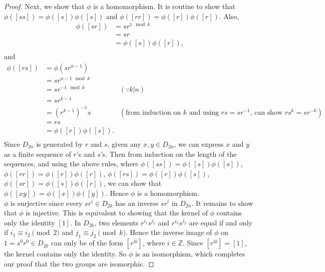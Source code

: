 \documentclass{article}
\begin{document}
\begin{enumerate}
\begin{enumerate}
\begin{enumerate}
\begin{proof}
              Next, we show that $\phi$ is a homomorphism. It is routine to
              show that $\phi([ss])=\phi([s])\phi([s])$ and
              $\phi([rr])=\phi([r])\phi([r])$. Also,
              \begin{align*}
                \phi([sr])  &= sr^{1\mod{k}}        \\
                            &= sr                   \\
                            &= \phi([s])\phi([r]),  \\
              \end{align*}
              and
              \begin{align*}
                \phi([rs])  &= \phi(sr^{n-1})   & \\
                            &= sr^{n-1\mod{k}}  & \\
                            &= sr^{-1\mod{k}}   & (\because k|n) \\
                            &= sr^{k-1}         & \\
                            &= (r^{k-1})^{-1}s  & (\text{from induction on
                            $k$ and using $rs=sr^{-1}$, can show
                            $rs^k=sr^{-k}$}) \\
                            &= rs               & \\
                            &= \phi([r])\phi([s]).  \\
              \end{align*}
              Since $D_{2n}$ is generated by $r$ and $s$, given any
              $x,y\in D_{2n}$, we can express $x$ and $y$ as a finite
              sequence of $r$'s and $s$'s. Then from induction on the
              length of the sequences, and using the above rules, where
              $\phi([ss])=\phi([s])\phi([s])$,
              $\phi([rr])=\phi([r])\phi([r])$,
              $\phi([rs])=\phi([r])\phi([s])$,
              $\phi([sr])=\phi([s])\phi([r])$, we can
              show that $\phi([xy])=\phi([x])\phi([y])$. Hence $\phi$ is a
              homomorphism. \\

              $\phi$ is surjective since every $sr^i\in D_{2k}$ has an
              inverse $sr^i$ in $D_{2n}$. It remains to show that $\phi$
              is injective. This is equivalent to showing that the kernel
              of $\phi$ contains only the identity $[1]$.
              In $D_{2k}$, two elements $r^{i_1}s^{j_1}$ and
              $r^{i_2}s^{j_2}$ are equal if and only if $i_1\equiv i_2
              \pmod{2}$ and $j_1\equiv j_2\pmod{k}$. Hence the inverse
              image of $\phi$ on $1=s^0r^0\in D_{2k}$ can only be of the
              form $[r^{4i}]$, where $i\in\mathbb{Z}$. Since
              $[r^{4i}]=[1]$, the kernel contains only the identity. So
              $\phi$ is an isomorphism, which completes our proof that the
              two groups are isomorphic.
            \end{proof}
        \end{enumerate}


\end{enumerate}
\end{enumerate}
\end{document}
